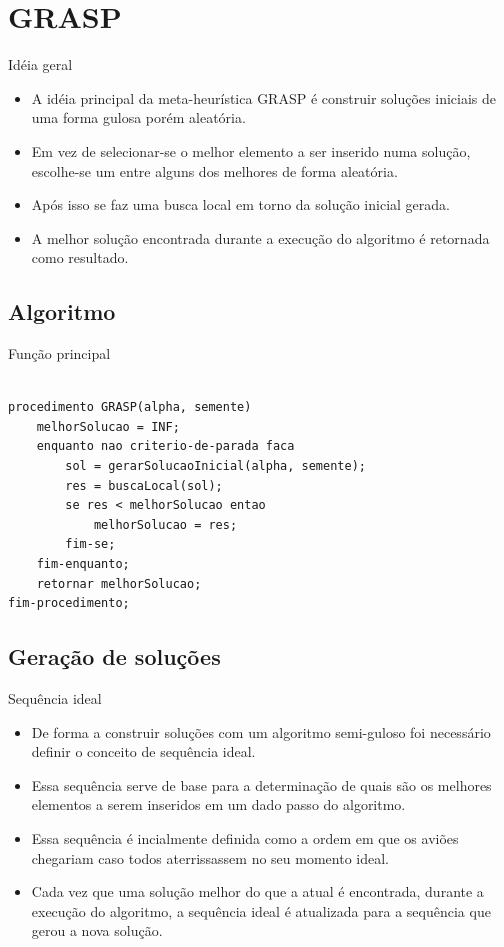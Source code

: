 \documentclass[xcolor=dvipsnames]{beamer}
\begin{document}
\section{GRASP}

\begin{frame}{Idéia geral}
 \begin{itemize}[<+-| alert@+>]
  \item{A idéia principal da meta-heurística GRASP é construir soluções iniciais de uma forma gulosa porém aleatória.}
  \item{Em vez de selecionar-se o melhor elemento a ser inserido numa solução, escolhe-se um entre alguns dos melhores de forma aleatória.}
  \item{Após isso se faz uma busca local em torno da solução inicial gerada.}
  \item{A melhor solução encontrada durante a execução do algoritmo é retornada como resultado.}
 \end{itemize}  
\end{frame}

\subsection{Algoritmo}


\begin{frame}[fragile]{Função principal}

\begin{lstlisting}

procedimento GRASP(alpha, semente)
    melhorSolucao = INF;
    enquanto nao criterio-de-parada faca
        sol = gerarSolucaoInicial(alpha, semente);
        res = buscaLocal(sol);
        se res < melhorSolucao entao
            melhorSolucao = res;
        fim-se;
    fim-enquanto;
    retornar melhorSolucao;
fim-procedimento;

\end{lstlisting}

\end{frame}


\subsection{Geração de soluções}

\begin{frame}{Sequência ideal}
 \begin{itemize}[<+-| alert@+>]
  \item{De forma a construir soluções com um algoritmo semi-guloso foi necessário definir o conceito de sequência ideal.}
  \item{Essa sequência serve de base para a determinação de quais são os melhores elementos a serem inseridos em um dado passo do algoritmo.}
  \item{Essa sequência é incialmente definida como a ordem em que os aviões chegariam caso todos aterrissassem no seu momento ideal.}
  \item{Cada vez que uma solução melhor do que a atual é encontrada, durante a execução do algoritmo, a sequência ideal é atualizada para a sequência que gerou a nova solução.}
 \end{itemize}  
\end{frame}
\end{document}
